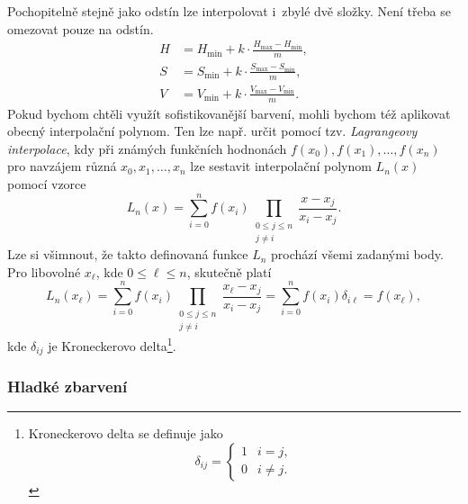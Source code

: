 Pochopitelně stejně jako odstín lze interpolovat i~zbylé dvě složky. Není třeba se omezovat pouze na odstín.
\begin{align*}
    H&=H_{\text{min}}+k\cdot\frac{H_{\text{max}}-H_{\text{min}}}{m},\\
    S&=S_{\text{min}}+k\cdot\frac{S_{\text{max}}-S_{\text{min}}}{m},\\
    V&=V_{\text{min}}+k\cdot\frac{V_{\text{max}}-V_{\text{min}}}{m}.
\end{align*}
Pokud bychom chtěli využít sofistikovanější barvení, mohli bychom též aplikovat obecný interpolační polynom. Ten lze např. určit pomocí tzv. \emph{Lagrangeovy interpolace}, kdy při známých funkčních hodnonách $f(x_0),f(x_1),\ldots,f(x_n)$ pro navzájem různá $x_0,x_1,\ldots,x_n$ lze sestavit interpolační polynom $L_n(x)$ pomocí vzorce
\[L_n(x)=\sum_{i=0}^{n}f(x_i)\prod_{\substack{0\leqslant j\leqslant n\\j\neq i}}{\frac {x-x_{j}}{x_{i}-x_{j}}}.\]
Lze si všimnout, že takto definovaná funkce $L_n$ prochází všemi zadanými body. Pro libovolné $x_\ell$, kde $0\leqslant\ell\leqslant n$, skutečně platí
\[L_n(x_\ell)=\sum_{i=0}^{n}f(x_i)\prod_{\substack{0\leqslant j\leqslant n\\j\neq i}}{\frac {x_\ell-x_{j}}{x_{i}-x_{j}}}=\sum_{i=0}^{n}f(x_i)\delta_{i\ell}=f(x_\ell),\]
kde $\delta_{ij}$ je Kroneckerovo delta\footnote{Kroneckerovo delta se definuje jako
\[\delta_{ij}=\begin{cases}
    1 & i=j,\\
    0 & i\neq j.
\end{cases}\]
}.

\subsubsection{Hladké zbarvení}

